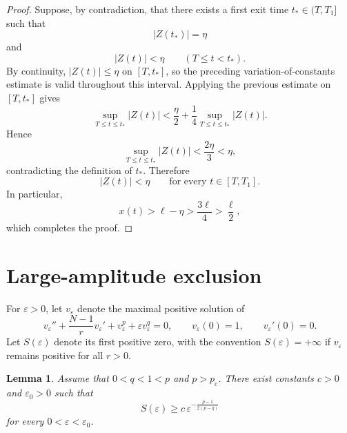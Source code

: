 \documentclass[11pt]{article}
\newcommand{\pc}{p_{\mathrm c}}
\newcommand{\oldrev}[1]{#1}
\newtheorem{lemma}[theorem]{Lemma}
\theoremstyle{definition}
\begin{document}
\begin{proof}
Suppose, by contradiction, that there exists a first exit time
$t_*\in(T,T_1]$ such that
\[
|Z(t_*)|=\eta
\]
and
\[
|Z(t)|<\eta
\qquad
(T\leq t<t_*).
\]
\oldrev{By continuity, $|Z(t)|\leq\eta$ on $[T,t_*]$, so the
preceding variation-of-constants estimate is valid throughout this
interval.}
Applying the previous estimate on $[T,t_*]$ gives
\[
\sup_{T\leq t\leq t_*}|Z(t)|
<
\frac{\eta}{2}
+
\frac14
\sup_{T\leq t\leq t_*}|Z(t)|.
\]
Hence
\[
\sup_{T\leq t\leq t_*}|Z(t)|
<
\frac{2\eta}{3}
<\eta,
\]
contradicting the definition of $t_*$. Therefore
\[
|Z(t)|<\eta
\qquad
\text{for every }t\in[T,T_1].
\]
In particular,
\[
x(t)>\ell-\eta>\frac{3\ell}{4}>\frac{\ell}{2},
\]
which completes the proof.
\end{proof}
    


\section{Large-amplitude exclusion}

For $\varepsilon>0$, let $v_\varepsilon$ denote the maximal positive
solution of
\begin{equation}
\label{eq:veps}
v_\varepsilon''
+\frac{N-1}{r}v_\varepsilon'
+v_\varepsilon^p
+\varepsilon v_\varepsilon^q
=0,
\qquad
v_\varepsilon(0)=1,
\qquad
v_\varepsilon'(0)=0.
\end{equation}
Let $S(\varepsilon)$ denote its first positive zero, with the
convention
\(
S(\varepsilon)=+\infty
\)
if $v_\varepsilon$ remains positive for all $r>0$.

\begin{lemma}
\label{lem:S-lower}
\oldrev{Assume that $0<q<1<p$ and $p>\pc$.}
There exist constants $c>0$ and $\varepsilon_0>0$ such that
\begin{equation}
\label{eq:Sbound}
S(\varepsilon)
\geq
c\,
\varepsilon^{-\frac{p-1}{2(p-q)}}
\end{equation}
for every $0<\varepsilon<\varepsilon_0$.
\end{lemma}
\end{document}
